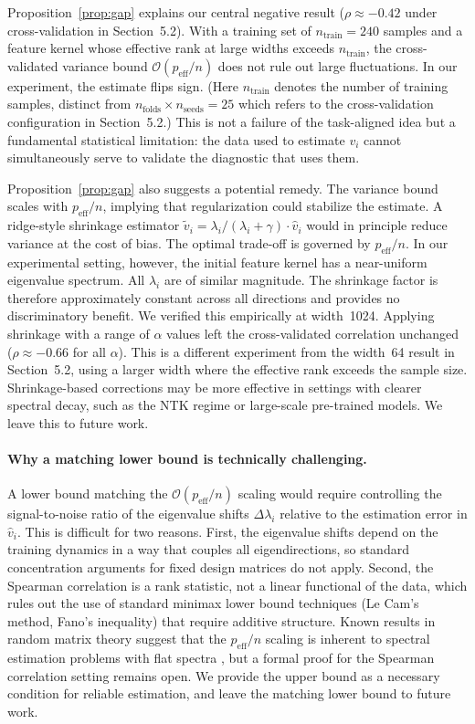 \documentclass[twoside,11pt]{article}
\begin{document}
Proposition~\ref{prop:gap} explains our central negative result ($\rho \approx -0.42$ under cross-validation in Section~5.2). With a training set of $n_{\text{train}}=240$ samples and a feature kernel whose effective rank at large widths exceeds $n_{\text{train}}$, the cross-validated variance bound $\mathcal{O}(p_{\text{eff}} / n)$ does not rule out large fluctuations. In our experiment, the estimate flips sign. (Here $n_{\text{train}}$ denotes the number of training samples, distinct from $n_{\text{folds}} \times n_{\text{seeds}} = 25$ which refers to the cross-validation configuration in Section~5.2.)  This is not a failure of the task-aligned idea but a fundamental statistical limitation: the data used to estimate $v_i$ cannot simultaneously serve to validate the diagnostic that uses them.

Proposition~\ref{prop:gap} also suggests a potential remedy. The variance bound scales with $p_{\text{eff}} / n$, implying that regularization could stabilize the estimate. A ridge-style shrinkage estimator $\tilde{v}_i = \lambda_i / (\lambda_i + \gamma) \cdot \hat{v}_i$ would in principle reduce variance at the cost of bias. The optimal trade-off is governed by $p_{\text{eff}} / n$. In our experimental setting, however, the initial feature kernel has a near-uniform eigenvalue spectrum. All $\lambda_i$ are of similar magnitude. The shrinkage factor is therefore approximately constant across all directions and provides no discriminatory benefit. We verified this empirically at width~1024. Applying shrinkage with a range of $\alpha$ values left the cross-validated correlation unchanged ($\rho \approx -0.66$ for all $\alpha$). This is a different experiment from the width~64 result in Section~5.2, using a larger width where the effective rank exceeds the sample size. Shrinkage-based corrections may be more effective in settings with clearer spectral decay, such as the NTK regime or large-scale pre-trained models. We leave this to future work.

\paragraph{Why a matching lower bound is technically challenging.}
A lower bound matching the $\mathcal{O}(p_{\text{eff}} / n)$ scaling would require controlling the signal-to-noise ratio of the eigenvalue shifts $\Delta\lambda_i$ relative to the estimation error in $\hat{v}_i$. This is difficult for two reasons. First, the eigenvalue shifts depend on the training dynamics in a way that couples all eigendirections, so standard concentration arguments for fixed design matrices do not apply. Second, the Spearman correlation is a rank statistic, not a linear functional of the data, which rules out the use of standard minimax lower bound techniques (Le Cam's method, Fano's inequality) that require additive structure. Known results in random matrix theory suggest that the $p_{\text{eff}} / n$ scaling is inherent to spectral estimation problems with flat spectra \citep{el2010concentration}, but a formal proof for the Spearman correlation setting remains open. We provide the upper bound as a necessary condition for reliable estimation, and leave the matching lower bound to future work.
\end{document}
